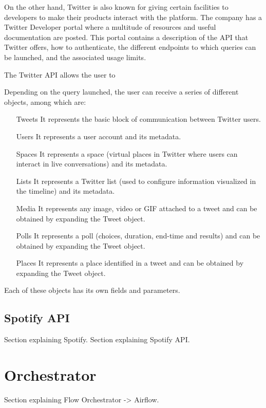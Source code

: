 \nonzeroparskip On the other hand, Twitter is also known for giving certain facilities to developers to make their products interact with the platform. The company has a Twitter Developer portal where a multitude of resources and useful documentation are posted. This portal contains a description of the API that Twitter offers, how to authenticate, the different endpoints to which queries can be launched, and the associated usage limits.

\nonzeroparskip The Twitter API allows the user to 

\nonzeroparskip Depending on the query launched, the user can receive a series of different objects, among which are:
\begin{itemize}
	\item[Tweets] It represents the basic block of communication between Twitter users.
	\item[Users] It represents a user account and its metadata.
	\item[Spaces] It represents a space (virtual places in Twitter where users can interact in live conversations) and its metadata.
	\item[Lists] It represents a Twitter list (used to configure information visualized in the timeline) and its metadata.
	\item[Media] It represents any image, video or GIF attached to a tweet and can be obtained by expanding the Tweet object.
	\item[Polls] It represents a poll (choices, duration, end-time and results) and can be obtained by expanding the Tweet object.
	\item[Places] It represents a place identified in a tweet and can be obtained by expanding the Tweet object.
\end{itemize}

\nonzeroparskip Each of these objects has its own fields and parameters.

\subsection{Spotify API}
\nonzeroparskip Section explaining Spotify.
\nonzeroparskip Section explaining Spotify API.

\section{Orchestrator}

\nonzeroparskip Section explaining Flow Orchestrator -> Airflow.

